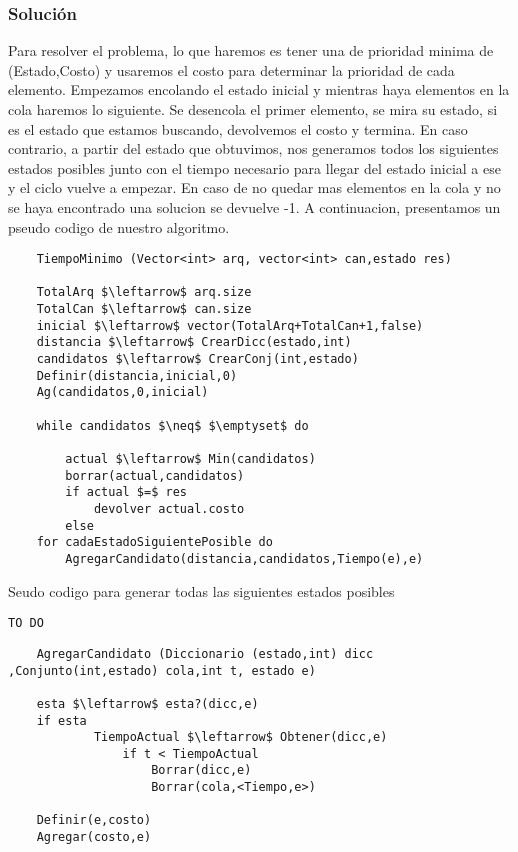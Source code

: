 	\subsubsection{Solución}


	Para resolver el problema, lo que haremos es tener una de prioridad minima de  (Estado,Costo) y usaremos el costo para determinar la prioridad de cada elemento.
	Empezamos encolando el estado inicial y mientras haya elementos en la cola haremos lo siguiente.
	Se desencola el primer elemento, se mira su estado, si es el estado que estamos buscando, devolvemos el costo y termina.
	En caso contrario, a partir del estado que obtuvimos, nos generamos todos los siguientes estados posibles junto con el tiempo necesario para llegar del estado inicial a ese y el ciclo vuelve a empezar.
	En caso de no quedar mas elementos en la cola y no se haya encontrado una solucion se devuelve -1.
	A continuacion, presentamos un pseudo codigo de nuestro algoritmo.


\lstset{basicstyle=\large}
\begin{lstlisting}
	TiempoMinimo (Vector<int> arq, vector<int> can,estado res)

	TotalArq $\leftarrow$ arq.size
	TotalCan $\leftarrow$ can.size
	inicial $\leftarrow$ vector(TotalArq+TotalCan+1,false)
	distancia $\leftarrow$ CrearDicc(estado,int)
	candidatos $\leftarrow$ CrearConj(int,estado)
	Definir(distancia,inicial,0)
	Ag(candidatos,0,inicial)

	while candidatos $\neq$ $\emptyset$ do

		actual $\leftarrow$ Min(candidatos)
		borrar(actual,candidatos)
		if actual $=$ res
			devolver actual.costo
		else
	for cadaEstadoSiguientePosible do
		AgregarCandidato(distancia,candidatos,Tiempo(e),e)

\end{lstlisting}

Seudo codigo para generar todas las siguientes estados posibles
\lstset{basicstyle=\large}

\begin{lstlisting}
TO DO
\end{lstlisting}

\lstset{basicstyle=\large}
\begin{lstlisting}
	AgregarCandidato (Diccionario (estado,int) dicc ,Conjunto(int,estado) cola,int t, estado e)

	esta $\leftarrow$ esta?(dicc,e)
	if esta
			TiempoActual $\leftarrow$ Obtener(dicc,e)
				if t < TiempoActual
					Borrar(dicc,e)
					Borrar(cola,<Tiempo,e>)

	Definir(e,costo)
	Agregar(costo,e)

\end{lstlisting}

